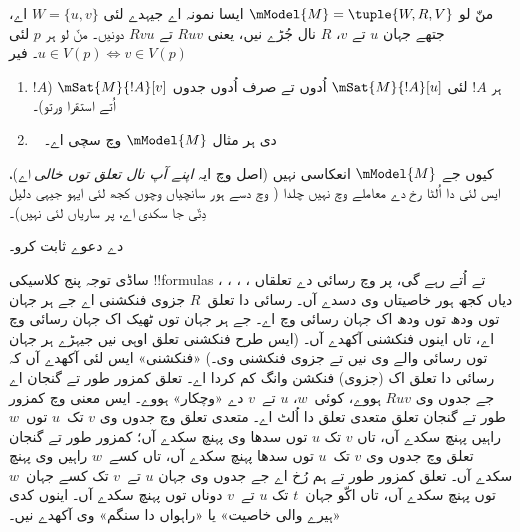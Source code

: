 \documentclass[../../../include/open-logic-section]{subfiles}
\begin{document}
\begin{prop}
  منّ لو $\mModel{M} = \tuple{W, R, V}$ ایسا نمونہ اے جیہدے لئی $W = \{u, v
  \}$ اے، جتھے جہان $u$ تے $v$، $R$ نال جُڑے نیں، یعنی $Ruv$
  تے $Rvu$ دونیں۔ منّ لو ہر $p$ لئی $u \in V(p) \Leftrightarrow v
  \in V(p)$۔ فیر
  \begin{enumerate}
  \item ہر $!A$ لئی $\mSat{M}{!A}[u]$ اُدوں تے صرف اُدوں جدوں
    $\mSat{M}{!A}[v]$ ($!A$ اُتے استقرا ورتو)۔
  \item ~ دی ہر مثال $\mModel{M}$ وچ سچی اے۔
  \end{enumerate}
  کیوں جے $\mModel{M}$ انعکاسی نہیں (اصل وچ ایہ \emph{اپنے آپ نال تعلق توں خالی} اے)، ایس لئی  دا اُلٹا رخ  دے معاملے وچ نہیں چلدا ( وچ دسے ہور سانچیاں وچوں کجھ لئی ایہو جیہی دلیل دِتّی جا سکدی اے، پر ساریاں لئی نہیں)۔
\end{prop}

\begin{prob}
   دے دعوے ثابت کرو۔
\end{prob}

ساڈی توجہ پنج کلاسیکی !!{formula}s ،
، ، ، تے  اُتے رہے گی، پر
 وچ رسائی دے تعلقاں دیاں کجھ ہور خاصیتاں وی دسدے آں۔ رسائی دا تعلق~$R$ جزوی فنکشنی اے جے ہر جہان توں ودھ توں ودھ اک جہان رسائی وچ اے۔ جے ہر جہان توں ٹھیک اک جہان رسائی وچ اے، تاں اینوں فنکشنی آکھدے آں۔ (ایس طرح فنکشنی تعلق اوہی نیں جیہڑے ہر جہان توں رسائی والے وی نیں تے جزوی فنکشنی وی۔) «فنکشنی» ایس لئی آکھدے آں کہ رسائی دا تعلق اک (جزوی) فنکشن وانگ کم کردا اے۔ تعلق کمزور طور تے گنجان اے جے جدوں وی $Ruv$ ہووے، کوئی~$w$، $u$ تے~$v$ دے «وچکار» ہووے۔ ایس معنی وچ کمزور طور تے گنجان تعلق متعدی تعلق دا اُلٹ اے۔ متعدی تعلق وچ جدوں وی $v$ تک~$u$ توں~$w$ راہیں پہنچ سکدے آں، تاں $v$ تک $u$ توں سدھا وی پہنچ سکدے آں؛ کمزور طور تے گنجان تعلق وچ جدوں وی $v$ تک~$u$ توں سدھا پہنچ سکدے آں، تاں کسے~$w$ راہیں وی پہنچ سکدے آں۔ تعلق کمزور طور تے ہم رُخ اے جے جدوں وی جہان $u$ تے~$v$ تک کسے جہان~$w$ توں پہنچ سکدے آں، تاں اکّو جہان~$t$ تک $u$ تے~$v$ دوناں توں پہنچ سکدے آں۔ اینوں کدی «ہیرے والی خاصیت» یا «راہواں دا سنگم» وی آکھدے نیں۔
\end{document}
